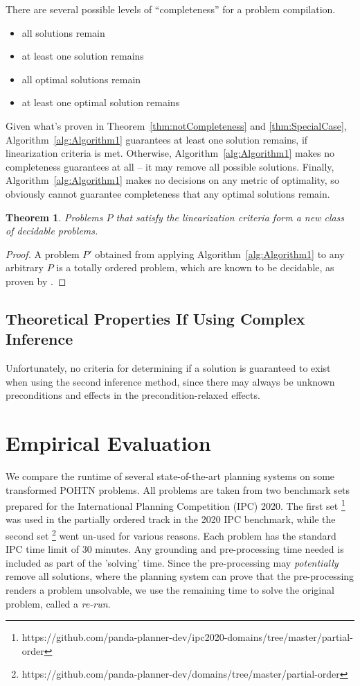 \documentclass[letterpaper]{article} %
\newtheorem{theorem}{Theorem}
\begin{document}
There are several possible levels of \enquote{completeness} for a problem compilation.
\begin{itemize}
	\item all solutions remain 
	\item at least one solution remains 
	\item all optimal solutions remain
	\item at least one optimal solution remains 	
\end{itemize}
Given what's proven in Theorem~\ref{thm:notCompleteness} and \ref{thm:SpecialCase}, Algorithm~\ref{alg:Algorithm1} guarantees at least one solution remains, if linearization criteria is met. Otherwise, Algorithm~\ref{alg:Algorithm1} makes no completeness guarantees at all -- it may remove all possible solutions. Finally, Algorithm~\ref{alg:Algorithm1} makes no decisions on any metric of optimality, so obviously cannot guarantee completeness that any optimal solutions remain.


\begin{theorem}\label{thm:newClass}
	Problems $P$ that satisfy the linearization criteria form a new class of decidable problems.
\end{theorem}
\begin{proof}
	A problem $P'$ obtained from applying Algorithm~\ref{alg:Algorithm1} to any arbitrary $P$ is a totally ordered problem, which are known to be decidable, as proven by \cite{Alford2015TightHTNBounds}.  
\end{proof}


\subsection{Theoretical Properties If Using Complex Inference}
Unfortunately, no criteria for determining if a solution is guaranteed to exist when using the second inference method, since there may always be unknown preconditions and effects in the precondition-relaxed effects.




\section{Empirical Evaluation}
We compare the runtime of several state-of-the-art planning systems on some transformed POHTN problems. All problems are taken from two benchmark sets prepared for the International Planning Competition (IPC) 2020. The first set \footnote{https://github.com/panda-planner-dev/ipc2020-domains/tree/master/partial-order} was used in the partially ordered track in the 2020 IPC benchmark, while the second set \footnote{https://github.com/panda-planner-dev/domains/tree/master/partial-order} went un-used for various reasons. Each problem has the standard IPC time limit of 30 minutes. Any grounding and pre-processing time needed is included as part of the 'solving' time. Since the pre-processing may \emph{potentially} remove all solutions, where the planning system can prove that the pre-processing renders a problem unsolvable, we use the remaining time to solve the original problem, called a \textit{re-run}.
\end{document}
